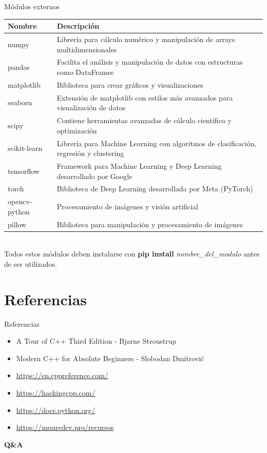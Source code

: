 \documentclass[11pt]{beamer}
\begin{document}
\begin{frame}{Módulos externos}
	\scriptsize
	\begin{tabularx}{\linewidth}{>{\raggedright\arraybackslash}p{3.5cm} X}
		\toprule
		\textbf{Nombre} & \textbf{Descripción} \\
		\midrule
		numpy & Librería para cálculo numérico y manipulación de arrays multidimensionales \\
		pandas & Facilita el análisis y manipulación de datos con estructuras como DataFrames \\
		matplotlib & Biblioteca para crear gráficos y visualizaciones \\
		seaborn & Extensión de matplotlib con estilos más avanzados para visualización de datos \\
		scipy & Contiene herramientas avanzadas de cálculo científico y optimización \\
		scikit-learn & Librería para Machine Learning con algoritmos de clasificación, regresión y clustering \\
		tensorflow & Framework para Machine Learning y Deep Learning desarrollado por Google \\
		torch & Biblioteca de Deep Learning desarrollada por Meta (PyTorch) \\
		opencv-python & Procesamiento de imágenes y visión artificial \\
		pillow & Biblioteca para manipulación y procesamiento de imágenes \\
		\bottomrule
	\end{tabularx}\\
	\vspace{.3cm}
	Todos estos módulos deben instalarse con \textbf{pip install} \textit{nombre\_del\_modulo} antes de ser utilizados.
\end{frame}

\section{Referencias}
\begin{frame}{Referencias}
\begin{itemize}
	\item A Tour of C++ Third Edition - Bjarne Stroustrup
	\item Modern C++ for Absolute Beginners - Slobodan Dmitrović
	\item \url{https://en.cppreference.com/}
	\item \url{https://hackingcpp.com/}
	\item \url{https://docs.python.org/}
	\item \url{https://mouredev.pro/recursos}
\end{itemize}
\end{frame}

\begin{frame}
	\centering
	\Huge \textbf{Q\&A}
\end{frame}
\end{document}
